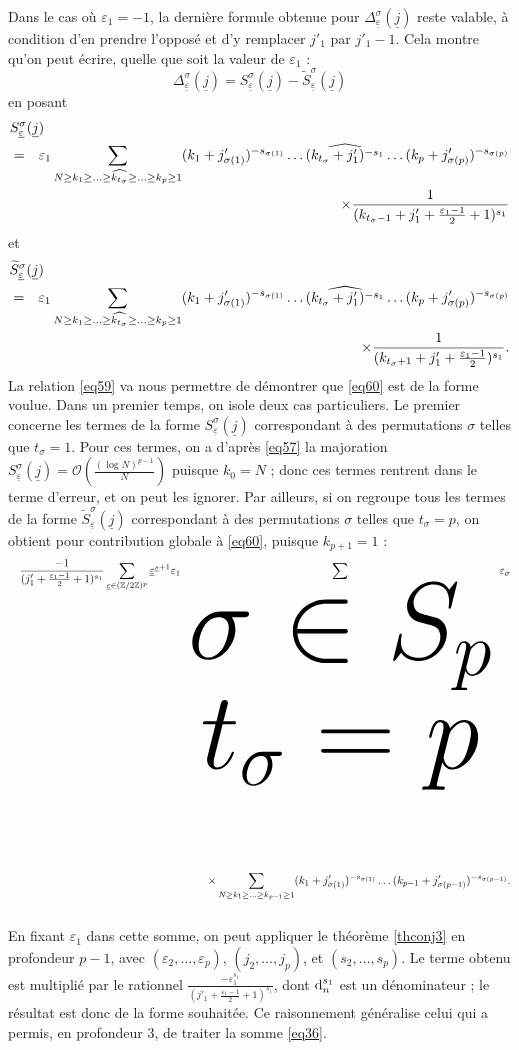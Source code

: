 \documentclass[12pt,francais, reqno]{smfart}
\numberwithin{equation}{section}
\newcommand{\dd}{\textup{d}}
\def\dd{\textup{d}}
\newcommand{\Z}{\mathbb Z}
\newcommand{\gdo}{\mathcal{O}}
\newcommand{\indso}[2]{{\tiny {\begin{array}{c} #1 \\ #2 \end{array}}}}
\newcommand{\spp}{{\mathfrak S}_p}
\newcommand{\zdzp}{(\Z / 2 \Z)^p}
\newcommand{\eps}{\varepsilon}
\newcommand{\epssoul}{\underline{\eps}}
\newcommand{\jsoul}{\underline{j}}
\newcommand{\ssoul}{\underline{s}}
\newcommand{\jprun}{j'_1+\frac{\eps_1-1}{2}}
\newcommand{\tsig}{t_{\sigma}}
\newcommand{\desj}{\Delta_{\epssoul} ^\sigma (\jsoul)}
\newcommand{\sesj}{S_{\epssoul} ^\sigma (\jsoul)}
\newcommand{\sesjti}{\widetilde{S}_{\epssoul} ^\sigma (\jsoul)}
\begin{document}
Dans le cas o\`u  $\eps_1=-1$, la derni\`ere formule obtenue pour $\desj$ reste valable, \`a condition 
d'en prendre l'oppos\'e et d'y remplacer $j'_1$ par $j'_1-1$. Cela montre qu'on peut \'ecrire, quelle que soit la valeur de $\eps_1$ : 
\begin{equation} \label{eq59}
\desj = \sesj - \sesjti
\end{equation}
en posant 
\begin{eqnarray} 
\lefteqn{\sesj  } \nonumber \\ 
&=&\eps_1  \sum_{N \geq k_1 \geq \ldots \geq \widehat{k_{\tsig}} \geq \ldots  \geq k_p  \geq 1} 
(k_1+j'_{\sigma(1)})^{-s_{\sigma(1)}} \ldots   \widehat{ (k_{\tsig}+j'_1)^{-s_1} } \ldots  (k_p+j'_{\sigma(p)})^{-s_{\sigma(p)}}   \label{eq57} \\
&& \quad \quad \quad \quad \times    \frac{1}{ (k_{\tsig-1}+\jprun+1)^{s_1}}  \nonumber 
\end{eqnarray}
et 
\begin{eqnarray} 
\lefteqn{\sesjti } \nonumber \\
&=& \eps_1  \sum_{N \geq k_1 \geq \ldots \geq \widehat{k_{\tsig}} \geq \ldots  \geq k_p  \geq 1} 
(k_1+j'_{\sigma(1)})^{-s_{\sigma(1)}} \ldots   \widehat{ (k_{\tsig}+j'_1)^{-s_1} } \ldots  (k_p+j'_{\sigma(p)})^{-s_{\sigma(p)}}   \label{eq58} \\
&& \quad \quad \quad \quad \times    \frac{1}{ (k_{\tsig+1}+\jprun)^{s_1}}.  \nonumber 
\end{eqnarray}
La relation \eqref{eq59} va nous permettre de d\'emontrer que \eqref{eq60} est de la forme voulue. Dans un premier temps, on isole deux cas particuliers. Le premier concerne les termes de la forme $\sesj$ correspondant \`a des permutations $\sigma$ telles que $\tsig = 1$. Pour ces termes, on a d'apr\`es  \eqref{eq57} la majoration $\sesj = \gdo(\frac{(\log N)^{p-1}}{N})$ puisque $k_0 = N$ ; donc ces termes rentrent dans le terme d'erreur, et on peut les ignorer. Par ailleurs, si on regroupe tous les termes de la forme $\sesjti$ correspondant \`a des permutations $\sigma$ telles que $\tsig = p$, on obtient pour contribution globale \`a \eqref{eq60}, puisque $k_{p+1}=1$  : 
\begin{eqnarray} 
&& \frac{- 1}{ (\jprun + 1)^{s_1}} \sum_{\epssoul \in \zdzp} \epssoul ^{\ssoul + 1} \eps_1  \sum_\indso{\sigma \in \spp}{\tsig = p} \eps_\sigma   \label{eq62} \\
&&\times \sum_{N \geq k_1 \geq \ldots \geq k_{p-1}  \geq 1} 
(k_1+j'_{\sigma(1)})^{-s_{\sigma(1)}} \ldots (k_{p-1}+j'_{\sigma(p-1)})^{-s_{\sigma(p-1)}}.  \nonumber 
\end{eqnarray}
En fixant $\eps_1$ dans cette somme, on peut appliquer le th\'eor\`eme \ref{thconj3} en profondeur $p-1$, avec $(\eps_2, \ldots, \eps_p)$, $(j_2, \ldots, j_p)$, et $(s_2, \ldots, s_p)$. Le terme obtenu est multipli\'e par le rationnel $ \frac{- \eps_1 ^{s_1}}{ (\jprun + 1)^{s_1}} $, dont $\dd_n^{s_1}$ est un d\'enominateur ; le r\'esultat est donc de la forme souhait\'ee. Ce raisonnement g\'en\'eralise celui qui a permis, en profondeur 3, de traiter la somme \eqref{eq36}. 
\end{document}

